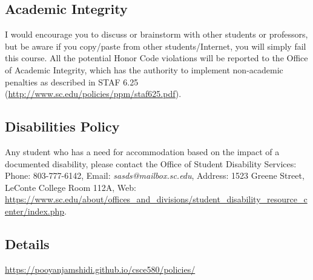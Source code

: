 \documentclass[11pt]{article}
\newcommand{\week}[1]{%
  \paragraph*{\kern-2ex\quad #1, \syldate{\today} - \AdvanceDate[4]\syldate{\today}:}%
  \ifdim\wd1=\wd\MONDAY
    \AdvanceDate[7]
  \else
    \AdvanceDate[7]
  \fi%
}
\begin{document}




\subsection*{Academic Integrity}

I would encourage you to discuss or brainstorm with other students or professors, but be aware if you copy/paste from other students/Internet, you will simply fail this course. All the potential Honor Code violations will be reported to the Office of Academic Integrity, which has the authority to implement non-academic penalties as described in STAF 6.25 (\url{http://www.sc.edu/policies/ppm/staf625.pdf}).

\subsection*{Disabilities Policy}

Any student who has a need for accommodation based on the impact of
a documented disability, please contact the Office of Student Disability Services: Phone: 803-777-6142, Email: \textit{sasds@mailbox.sc.edu}, Address: 1523 Greene Street, LeConte College Room 112A, Web: \url{https://www.sc.edu/about/offices_and_divisions/student_disability_resource_center/index.php}.

\subsection*{Details}
\url{https://pooyanjamshidi.github.io/csce580/policies/}




\end{document}

